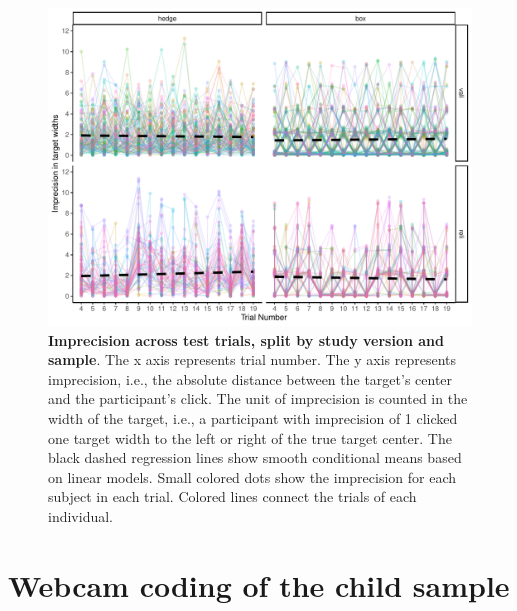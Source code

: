 \documentclass[
  man,floatsintext]{apa6}
\begin{document}
\begin{figure}

{\centering \includegraphics[width=1\linewidth]{../figures/tango_supplements_acrosstrials} 

}

\caption{\textbf{Imprecision across test trials, split by study version and sample}. The x axis represents trial number. The y axis represents imprecision, i.e., the absolute distance between the target's center and the participant's click. The unit of imprecision is counted in the width of the target, i.e., a participant with imprecision of 1 clicked one target width to the left or right of the true target center. The black dashed regression lines show smooth conditional means based on linear models. Small colored dots show the imprecision for each subject in each trial. Colored lines connect the trials of each individual.}\label{fig:fig2}
\end{figure}

\newpage

\hypertarget{webcam-coding-of-the-child-sample}{%
\section{Webcam coding of the child sample}\label{webcam-coding-of-the-child-sample}}
\end{document}
